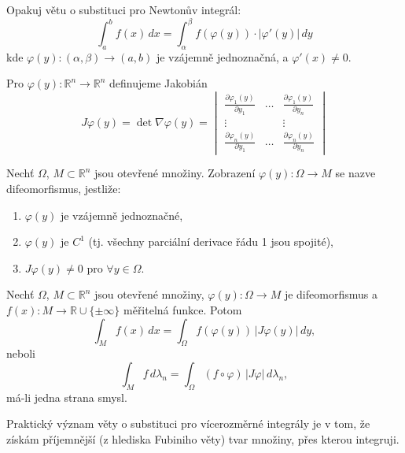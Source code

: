 \begin{poznamka}
Opakuj větu o substituci pro Newtonův integrál:
\[
\int_a^b f(x) \, dx
= \int_\alpha^\beta f(\varphi(y)) \cdot |\varphi'(y)| \, dy
\]
kde $\varphi(y) : (\alpha, \beta) \to (a, b)$ je vzájemně jednoznačná,
a $\varphi'(x) \ne 0$.
\end{poznamka}

\begin{definice}
Pro $\varphi(y) : \mathbb{R}^n \to \mathbb{R}^n$ definujeme Jakobián
\[
J\varphi(y) = \det \nabla\varphi(y) = \begin{vmatrix}
\frac{\partial \varphi_1(y)}{\partial y_1} & \dots &
\frac{\partial \varphi_1(y)}{\partial y_n} \\
\vdots & & \vdots \\
\frac{\partial \varphi_n(y)}{\partial y_1} & \dots &
\frac{\partial \varphi_n(y)}{\partial y_n}
\end{vmatrix}
\]
\end{definice}

\begin{definice}
Nechť $\Omega$, $M \subset \mathbb{R}^n$ jsou otevřené množiny.
Zobrazení $\varphi(y) : \Omega \to M$ se nazve difeomorfismus,
jestliže:
\begin{enumerate}[1.]
\item $\varphi(y)$ je vzájemně jednoznačné,
\item $\varphi(y)$ je $C^1$ (tj. všechny parciální derivace řádu 1
jsou spojité),
\item $J\varphi(y) \ne 0$ pro $\forall y \in \Omega$.
\end{enumerate}
\end{definice}

\begin{veta}
Nechť $\Omega$, $M \subset \mathbb{R}^n$ jsou otevřené množiny,
$\varphi(y) : \Omega \to M$ je difeomorfismus a
$f(x) : M \to \mathbb{R} \cup \{\pm\infty\}$ měřitelná funkce. Potom
\[
\int_M f(x) \, dx = \int_\Omega f(\varphi(y))\, |J\varphi(y)| \, dy,
\]
neboli
\[
\int_M f \, d\lambda_n
= \int_\Omega (f \circ \varphi)\, |J\varphi| \, d\lambda_n,
\]
má-li jedna strana smysl.
\end{veta}

\begin{poznamka}
Praktický význam věty o substituci pro vícerozměrné integrály je v tom,
že získám příjemnější (z hlediska Fubiniho věty) tvar množiny, přes
kterou integruji.
\end{poznamka}

